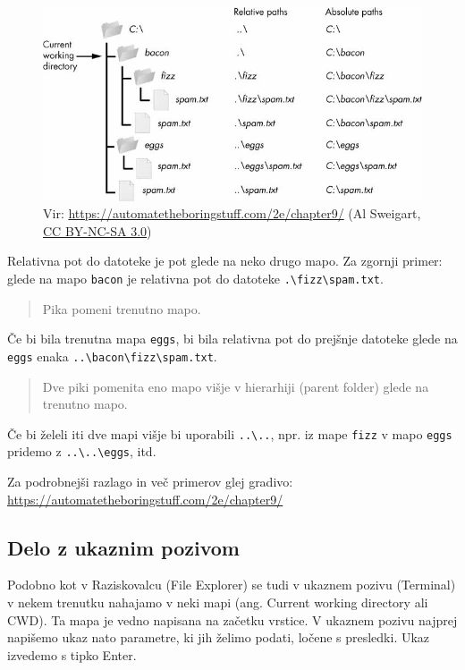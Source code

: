 \documentclass[
]{report}
\begin{document}
\begin{figure}
\centering
\includegraphics{./images/paths.jpeg}
\caption{Vir: \url{https://automatetheboringstuff.com/2e/chapter9/} (Al Sweigart, \href{https://creativecommons.org/licenses/by-nc-sa/3.0/}{CC BY-NC-SA 3.0})}
\end{figure}

Relativna pot do datoteke je pot glede na neko drugo mapo. Za zgornji primer:
glede na mapo \texttt{bacon} je relativna pot do datoteke \texttt{.\textbackslash{}fizz\textbackslash{}spam.txt}.

\begin{quote}
Pika pomeni trenutno mapo.
\end{quote}

Če bi bila trenutna mapa \texttt{eggs}, bi bila relativna pot do prejšnje datoteke
glede na \texttt{eggs} enaka \texttt{..\textbackslash{}bacon\textbackslash{}fizz\textbackslash{}spam.txt}.

\begin{quote}
Dve piki pomenita eno mapo višje v hierarhiji (parent folder) glede na trenutno mapo.
\end{quote}

Če bi želeli iti dve mapi višje bi uporabili \texttt{..\textbackslash{}..}, npr. iz mape
\texttt{fizz} v mapo \texttt{eggs} pridemo z \texttt{..\textbackslash{}..\textbackslash{}eggs}, itd.

Za podrobnejši razlago in več primerov glej gradivo: \url{https://automatetheboringstuff.com/2e/chapter9/}

\hypertarget{delo-z-ukaznim-pozivom}{%
\subsection{Delo z ukaznim pozivom}\label{delo-z-ukaznim-pozivom}}

Podobno kot v Raziskovalcu (File Explorer) se tudi v ukaznem pozivu (Terminal) v
nekem trenutku nahajamo v neki mapi (ang. Current working directory ali CWD).
Ta mapa je vedno napisana na začetku vrstice. V ukaznem pozivu najprej napišemo ukaz nato parametre, ki jih želimo podati, ločene s presledki. Ukaz izvedemo s tipko Enter.
\end{document}
